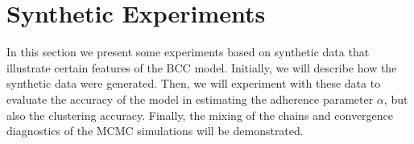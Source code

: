 \section{Synthetic Experiments} \label{integr-synth-exper-sect}
In this section we present some experiments based on synthetic data that illustrate certain features of the BCC model. Initially, we will describe how the synthetic data were generated. Then, we will experiment with these data to evaluate the accuracy of the model in estimating the adherence parameter $\alpha$, but also the clustering accuracy. Finally, the mixing of the chains and convergence diagnostics of the MCMC simulations will be demonstrated.





